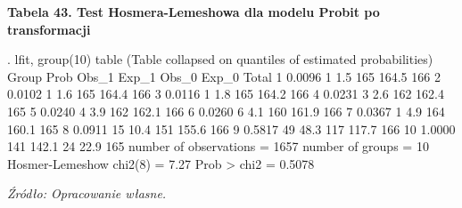 \vspace{0.5cm}
\textbf{Tabela 43. Test Hosmera-Lemeshowa dla modelu Probit po transformacji}
\begin{stlog}
. lfit, group(10) table 
{\smallskip}
{}
{\smallskip}
  (Table collapsed on quantiles of estimated probabilities)
  {\TLC}
  {\VBAR} Group {\VBAR}   Prob {\VBAR} Obs_1 {\VBAR} Exp_1 {\VBAR} Obs_0 {\VBAR} Exp_0 {\VBAR} Total {\VBAR}
  {\LFTT}
  {\VBAR}     1 {\VBAR} 0.0096 {\VBAR}     1 {\VBAR}   1.5 {\VBAR}   165 {\VBAR} 164.5 {\VBAR}   166 {\VBAR}
  {\VBAR}     2 {\VBAR} 0.0102 {\VBAR}     1 {\VBAR}   1.6 {\VBAR}   165 {\VBAR} 164.4 {\VBAR}   166 {\VBAR}
  {\VBAR}     3 {\VBAR} 0.0116 {\VBAR}     1 {\VBAR}   1.8 {\VBAR}   165 {\VBAR} 164.2 {\VBAR}   166 {\VBAR}
  {\VBAR}     4 {\VBAR} 0.0231 {\VBAR}     3 {\VBAR}   2.6 {\VBAR}   162 {\VBAR} 162.4 {\VBAR}   165 {\VBAR}
  {\VBAR}     5 {\VBAR} 0.0240 {\VBAR}     4 {\VBAR}   3.9 {\VBAR}   162 {\VBAR} 162.1 {\VBAR}   166 {\VBAR}
  {\LFTT}
  {\VBAR}     6 {\VBAR} 0.0260 {\VBAR}     6 {\VBAR}   4.1 {\VBAR}   160 {\VBAR} 161.9 {\VBAR}   166 {\VBAR}
  {\VBAR}     7 {\VBAR} 0.0367 {\VBAR}     1 {\VBAR}   4.9 {\VBAR}   164 {\VBAR} 160.1 {\VBAR}   165 {\VBAR}
  {\VBAR}     8 {\VBAR} 0.0911 {\VBAR}    15 {\VBAR}  10.4 {\VBAR}   151 {\VBAR} 155.6 {\VBAR}   166 {\VBAR}
  {\VBAR}     9 {\VBAR} 0.5817 {\VBAR}    49 {\VBAR}  48.3 {\VBAR}   117 {\VBAR} 117.7 {\VBAR}   166 {\VBAR}
  {\VBAR}    10 {\VBAR} 1.0000 {\VBAR}   141 {\VBAR} 142.1 {\VBAR}    24 {\VBAR}  22.9 {\VBAR}   165 {\VBAR}
  {\BLC}
{\smallskip}
       number of observations =      1657
             number of groups =        10
      Hosmer-Lemeshow chi2(8) =         7.27
                  Prob > chi2 =         0.5078
\end{stlog}
\textit{\footnotesize{Źródło: Opracowanie własne.}} \\

